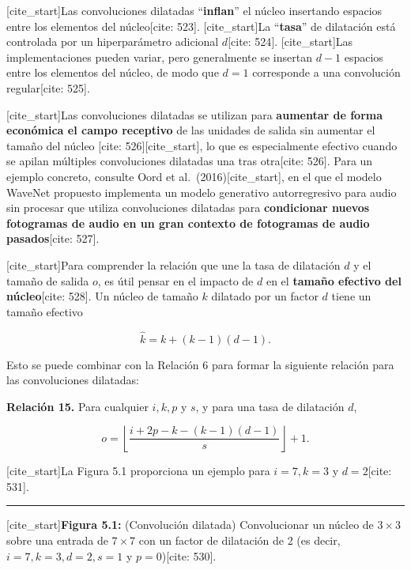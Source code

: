 \documentclass[
  super,
  preprint,
  3p]{elsarticle}
\begin{document}
{[}cite\_start{]}Las convoluciones dilatadas ``\textbf{inflan}'' el
núcleo insertando espacios entre los elementos del núcleo{[}cite:
523{]}. {[}cite\_start{]}La ``\textbf{tasa}'' de dilatación está
controlada por un hiperparámetro adicional \(d\){[}cite: 524{]}.
{[}cite\_start{]}Las implementaciones pueden variar, pero generalmente
se insertan \(d - 1\) espacios entre los elementos del núcleo, de modo
que \(d = 1\) corresponde a una convolución regular{[}cite: 525{]}.

{[}cite\_start{]}Las convoluciones dilatadas se utilizan para
\textbf{aumentar de forma económica el campo receptivo} de las unidades
de salida sin aumentar el tamaño del núcleo {[}cite:
526{]}{[}cite\_start{]}, lo que es especialmente efectivo cuando se
apilan múltiples convoluciones dilatadas una tras otra{[}cite: 526{]}.
Para un ejemplo concreto, consulte Oord et al.~(2016){[}cite\_start{]},
en el que el modelo WaveNet propuesto implementa un modelo generativo
autorregresivo para audio sin procesar que utiliza convoluciones
dilatadas para \textbf{condicionar nuevos fotogramas de audio en un gran
contexto de fotogramas de audio pasados}{[}cite: 527{]}.

{[}cite\_start{]}Para comprender la relación que une la tasa de
dilatación \(d\) y el tamaño de salida \(o\), es útil pensar en el
impacto de \(d\) en el \textbf{tamaño efectivo del núcleo}{[}cite:
528{]}. Un núcleo de tamaño \(k\) dilatado por un factor \(d\) tiene un
tamaño efectivo

\[\hat{k} = k + (k - 1)(d - 1).\]

Esto se puede combinar con la Relación 6 para formar la siguiente
relación para las convoluciones dilatadas:

\textbf{Relación 15.} Para cualquier \(i, k, p\) y \(s\), y para una
tasa de dilatación \(d\),

\[o = \left\lfloor \frac{i + 2p - k - (k - 1)(d - 1)}{s} \right\rfloor + 1.\]

{[}cite\_start{]}La Figura 5.1 proporciona un ejemplo para
\(i = 7, k = 3\) y \(d = 2\){[}cite: 531{]}.

\begin{center}\rule{0.5\linewidth}{0.5pt}\end{center}

{[}cite\_start{]}\textbf{Figura 5.1:} (Convolución dilatada)
Convolucionar un núcleo de \(3 \times 3\) sobre una entrada de
\(7 \times 7\) con un factor de dilatación de 2 (es decir,
\(i = 7, k = 3, d = 2, s = 1\) y \(p = 0\)){[}cite: 530{]}.
\end{document}
